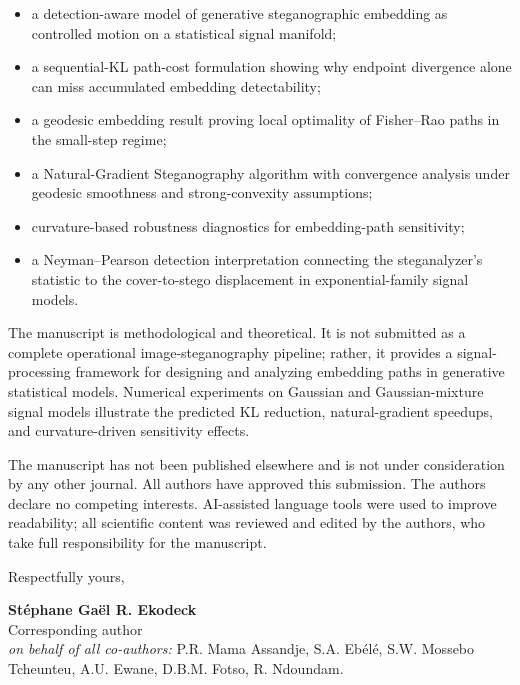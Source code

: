 \documentclass[12pt,a4paper]{article}
\begin{document}
\begin{itemize}
  \item a detection-aware model of generative steganographic embedding as
        controlled motion on a statistical signal manifold;
  \item a sequential-KL path-cost formulation showing why endpoint divergence
        alone can miss accumulated embedding detectability;
  \item a geodesic embedding result proving local optimality of Fisher--Rao
        paths in the small-step regime;
  \item a Natural-Gradient Steganography algorithm with convergence analysis
        under geodesic smoothness and strong-convexity assumptions;
  \item curvature-based robustness diagnostics for embedding-path sensitivity;
  \item a Neyman--Pearson detection interpretation connecting the steganalyzer's
        statistic to the cover-to-stego displacement in exponential-family
        signal models.
\end{itemize}

The manuscript is methodological and theoretical. It is not submitted as a
complete operational image-steganography pipeline; rather, it provides a
signal-processing framework for designing and analyzing embedding paths in
generative statistical models. Numerical experiments on Gaussian and
Gaussian-mixture signal models illustrate the predicted KL reduction,
natural-gradient speedups, and curvature-driven sensitivity effects.

The manuscript has not been published elsewhere and is not under consideration
by any other journal. All authors have approved this submission. The authors
declare no competing interests. AI-assisted language tools were used to improve
readability; all scientific content was reviewed and edited by the authors, who
take full responsibility for the manuscript.

\bigskip
Respectfully yours,

\medskip
\textbf{St\'ephane Ga\"el R. Ekodeck}\\
Corresponding author\\
\textit{on behalf of all co-authors:}
P.R. Mama Assandje,
S.A. Eb\'el\'e,
S.W. Mossebo Tcheunteu,
A.U. Ewane,
D.B.M. Fotso,
R. Ndoundam.
\end{document}
